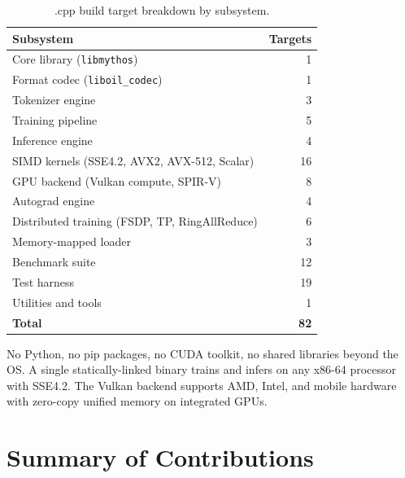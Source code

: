 \begin{table}[htbp]
\centering
\caption{\MYTHOS{}.cpp build target breakdown by subsystem.}
\label{tab:build_targets}
\begin{tabular}{lr}
\toprule
\textbf{Subsystem} & \textbf{Targets} \\
\midrule
Core library (\texttt{libmythos})                          & 1  \\
Format codec (\texttt{liboil\_codec})                     & 1  \\
Tokenizer engine                                           & 3  \\
Training pipeline                                          & 5  \\
Inference engine                                           & 4  \\
SIMD kernels (SSE4.2, AVX2, AVX-512, Scalar)              & 16 \\
GPU backend (Vulkan compute, SPIR-V)                       & 8  \\
Autograd engine                                            & 4  \\
Distributed training (FSDP, TP, RingAllReduce)             & 6  \\
Memory-mapped loader                                       & 3  \\
Benchmark suite                                            & 12 \\
Test harness                                               & 19 \\
Utilities and tools                                        & 1  \\
\midrule
\textbf{Total}                                             & \textbf{82} \\
\bottomrule
\end{tabular}
\end{table}

No Python, no pip packages, no CUDA toolkit, no shared libraries beyond the
OS. A single statically-linked binary trains and infers on any x86-64
processor with SSE4.2. The Vulkan backend supports AMD, Intel, and mobile
hardware with zero-copy unified memory on integrated GPUs.

\section{Summary of Contributions}
\label{sec:contributions}

